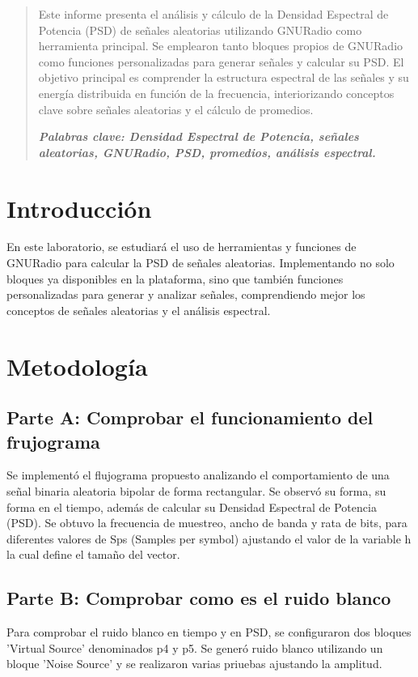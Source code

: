 \documentclass{journal}[IEEEtran, twocolumn]             %
\begin{document}
\begin{multicols}{2}

\begin{abstract}
    Este informe presenta el análisis y cálculo de la Densidad Espectral de Potencia (PSD) de señales aleatorias utilizando GNURadio como herramienta principal. Se emplearon tanto bloques propios de GNURadio como funciones personalizadas para generar señales y calcular su PSD. El objetivo principal es comprender la estructura espectral de las señales y su energía distribuida en función de la frecuencia, interiorizando conceptos clave sobre señales aleatorias y el cálculo de promedios.

 \textit{\textbf{Palabras clave: Densidad Espectral de Potencia, señales aleatorias, GNURadio, PSD, promedios, análisis espectral.}} 
\end{abstract}

\section{Introducción}
   En este laboratorio, se estudiará el uso de herramientas y funciones de GNURadio para calcular la PSD de señales aleatorias. Implementando no solo bloques ya disponibles en la plataforma, sino que también funciones personalizadas para generar y analizar señales, comprendiendo mejor los conceptos de señales aleatorias y el análisis espectral.


\section{Metodología}
\subsection{Parte A: Comprobar el funcionamiento del frujograma}
Se implementó el flujograma propuesto analizando el comportamiento de una señal binaria aleatoria bipolar de forma rectangular. Se observó su forma, su forma en el tiempo, además de calcular su Densidad Espectral de Potencia (PSD). Se obtuvo la frecuencia de muestreo, ancho de banda y rata de bits, para diferentes valores de Sps (Samples per symbol) ajustando el valor de la variable h la cual define el tamaño del vector.



\subsection{Parte B: Comprobar como es el ruido blanco}
Para comprobar el ruido blanco en tiempo y en PSD, se configuraron dos bloques 'Virtual Source'  denominados p4 y p5. Se generó ruido blanco utilizando un bloque 'Noise Source'  y se realizaron varias priuebas ajustando la amplitud. 


\end{multicols}
\end{document}
